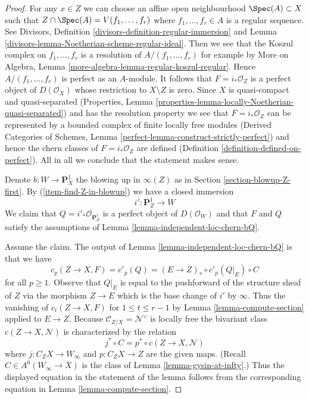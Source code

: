 \begin{proof}
For any $x \in Z$ we can choose an affine open neighbourhood
$\Spec(A) \subset X$ such that $Z \cap \Spec(A) = V(f_1, \ldots, f_r)$
where $f_1, \ldots, f_r \in A$ is a regular sequence.
See Divisors, Definition \ref{divisors-definition-regular-immersion} and
Lemma \ref{divisors-lemma-Noetherian-scheme-regular-ideal}.
Then we see that the Koszul complex on $f_1, \ldots, f_r$ is
a resolution of $A/(f_1, \ldots, f_r)$ for example by
More on Algebra, Lemma \ref{more-algebra-lemma-regular-koszul-regular}.
Hence $A/(f_1, \ldots, f_r)$ is perfect as an $A$-module.
It follows that $F = i_*\mathcal{O}_Z$ is a perfect object of
$D(\mathcal{O}_X)$ whose restriction to $X \setminus Z$ is zero.
Since $X$ is quasi-compact and quasi-separated
(Properties, Lemma \ref{properties-lemma-locally-Noetherian-quasi-separated})
and has the resolution property we see that $F = i_*\mathcal{O}_Z$ can be
represented by a bounded complex of finite locally free modules
(Derived Categories of Schemes, Lemma
\ref{perfect-lemma-construct-strictly-perfect}) and hence
the chern classes of $F = i_*\mathcal{O}_Z$ are defined
(Definition \ref{definition-defined-on-perfect}). All in all
we conclude that the statement makes sense.

\medskip\noindent
Denote $b : W \to \mathbf{P}^1_X$ the blowing up in $\infty(Z)$
as in Section \ref{section-blowup-Z-first}. By (\ref{item-find-Z-in-blowup})
we have a closed immersion
$$
i' : \mathbf{P}^1_Z \longrightarrow W
$$
We claim that $Q = i'_*\mathcal{O}_{\mathbf{P}^1_Z}$
is a perfect object of
$D(\mathcal{O}_W)$ and that $F$ and $Q$ satisfy the assumptions of
Lemma \ref{lemma-independent-loc-chern-bQ}.

\medskip\noindent
Assume the claim. The output of Lemma \ref{lemma-independent-loc-chern-bQ}
is that we have
$$
c_p(Z \to X, F) = c'_p(Q) = (E \to Z)_* \circ c'_p(Q|_E) \circ C
$$
for all $p \geq 1$. Observe that $Q|_E$ is equal to the pushforward of
the structure sheaf of $Z$ via the morphism $Z \to E$ which is the
base change of $i'$ by $\infty$.
Thus the vanishing of $c_t(Z \to X, F)$ for $1 \leq t \leq r - 1$
by Lemma \ref{lemma-compute-section} applied to $E \to Z$.
Because $\mathcal{C}_{Z/X} = \mathcal{N}^\vee$
is locally free the bivariant class $c(Z \to X, \mathcal{N})$
is characterized by the relation
$$
j^* \circ C = p^* \circ c(Z \to X, \mathcal{N})
$$
where $j : C_ZX \to W_\infty$ and $p : C_ZX \to Z$ are the given maps.
(Recall $C \in A^0(W_\infty \to X)$ is the class of
Lemma \ref{lemma-gysin-at-infty}.)
Thus the displayed equation in the statement of the lemma
follows from the corresponding equation in Lemma \ref{lemma-compute-section}.


\end{proof}
